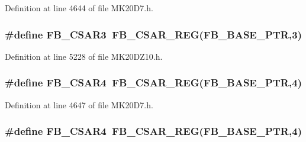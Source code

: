 Definition at line 4644 of file M\+K20\+D7.\+h.

\subsubsection[{\texorpdfstring{F\+B\+\_\+\+C\+S\+A\+R3}{FB_CSAR3}}]{\setlength{\rightskip}{0pt plus 5cm}\#define F\+B\+\_\+\+C\+S\+A\+R3~{\bf F\+B\+\_\+\+C\+S\+A\+R\+\_\+\+R\+EG}({\bf F\+B\+\_\+\+B\+A\+S\+E\+\_\+\+P\+TR},3)}\hypertarget{group___f_b___register___accessor___macros_gaeb2eeb947ae48a18e68351757decde18}{}\label{group___f_b___register___accessor___macros_gaeb2eeb947ae48a18e68351757decde18}


Definition at line 5228 of file M\+K20\+D\+Z10.\+h.

\subsubsection[{\texorpdfstring{F\+B\+\_\+\+C\+S\+A\+R4}{FB_CSAR4}}]{\setlength{\rightskip}{0pt plus 5cm}\#define F\+B\+\_\+\+C\+S\+A\+R4~{\bf F\+B\+\_\+\+C\+S\+A\+R\+\_\+\+R\+EG}({\bf F\+B\+\_\+\+B\+A\+S\+E\+\_\+\+P\+TR},4)}\hypertarget{group___f_b___register___accessor___macros_ga85235e470f6702746f44c992fe5a4490}{}\label{group___f_b___register___accessor___macros_ga85235e470f6702746f44c992fe5a4490}


Definition at line 4647 of file M\+K20\+D7.\+h.

\subsubsection[{\texorpdfstring{F\+B\+\_\+\+C\+S\+A\+R4}{FB_CSAR4}}]{\setlength{\rightskip}{0pt plus 5cm}\#define F\+B\+\_\+\+C\+S\+A\+R4~{\bf F\+B\+\_\+\+C\+S\+A\+R\+\_\+\+R\+EG}({\bf F\+B\+\_\+\+B\+A\+S\+E\+\_\+\+P\+TR},4)}\hypertarget{group___f_b___register___accessor___macros_ga85235e470f6702746f44c992fe5a4490}{}\label{group___f_b___register___accessor___macros_ga85235e470f6702746f44c992fe5a4490}



